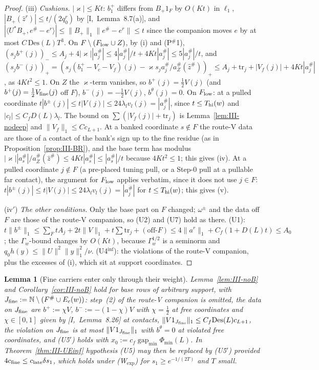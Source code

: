 \documentclass[10pt]{amsart}
\newtheorem{lemma}[theorem]{Lemma}
\theoremstyle{definition}
\theoremstyle{remark}
\newcommand{\N}{\mathbb N}
\newcommand{\gap}{\operatorname{gap}}
\newcommand{\zh}{\hat z}
\newcommand{\ip}[2]{\langle #1,#2\rangle}
\begin{document}
\begin{proof}
(iii) \emph{Cushions.}  $|\varkappa|\le Kt$: $b^+_1$ differs from $B_+1_F$ by
$O(Kt)$ in $\ell_1$, $|B_+(\zh^r)|\le t/(2q^r_0)$ by [I,~Lemma~8.7(a)], and
$|\ip{U^*B_+}{e^\#-e^r}|\le\|B_+\|_1\|e^\#-e^r\|\le t$ since the companion
moves $e$ by at most $C\,\mathrm{Des}(L)T^3$.  On $F\setminus(F_{\rm low}\cup Z)$,
by (i) and (P$^\#$1), $(s_jb^+(j))_-\le A_j+4|\varkappa||a^\#_j|\le
4|a^\#_j|/t+4Kt|a^\#_j|\le5|a^\#_j|/t$, and $(s_jb^-(j))_+=(s_j(b^+_1-V_c-V_f)(j)
-\varkappa s_ja^\#_j/a^\#_Z(\zh^\#))_+\le A_j+\mathrm{tr}_j+|V_f(j)|+4Kt|a^\#_j|$,
as $4Kt^2\le1$.  On $Z$ the $\varkappa$-term vanishes, so $b^+(j)=\frac12V(j)$
(and $b^+(j)=\frac12V_{\rm fine}(j)$ off $F$), $b^-(j)=-\frac12V(j)$, $b^\theta(j)=0$.
On $F_{\rm low}$: at a pulled coordinate
$t|b^\pm(j)|\le t|V(j)|\le24\lambda_lv_l(j)=|a^\#_j|$, since $t\le T_{\rm hi}(w)$
and $|c_l|\le C_fD(L)\lambda_l$.  The bound on $\sum(|V_f(j)|+\mathrm{tr}_j)$ is
Lemma~\ref{lem:III-nodeep} and $\|V_f\|_1\le Cc_{L+1}$.
At a banked coordinate $s\notin F$ the route-V data are those of a contact
of the bank's sign up to the fine residue (as in Proposition~\ref{prop:III-BR}),
and the base term has modulus $|\varkappa||a^\#_s|/a^\#_Z(\zh^\#)\le4Kt|a^\#_s|
\le|a^\#_s|/t$ because $4Kt^2\le1$; this gives (iv).  At a pulled coordinate
$j\notin F$ (a pre-placed tuning pull, or a Step-0 pull at a pullable far
contact), the argument for $F_{\rm low}$ applies verbatim, since it does not
use $j\in F$: $t|b^\pm(j)|\le t|V(j)|\le24\lambda_lv_l(j)=|a^\#_j|$ for
$t\le T_{\rm hi}(w)$; this gives (v).

(iv$'$) \emph{The other conditions.}  Only the base part on $F$ changed; $\omega^\pm$
and the data off $F$ are those of the route-V companion, so (U2) and (U7) hold
as there.  (U1): $t\|b^\pm\|_1\le\sum_FtA_j+2t\|V\|_1+t\sum\mathrm{tr}_j+
(\text{off-}F)\le4\|a^r\|_1+C_f(1+D(L)t)\le A_0$; the $\Gamma_w$-bound changes
by $O(Kt)$, because $\Gamma_w^{1/2}$ is a seminorm and $q_0h(y)\le\|U\|^2
\|y\|_1^2/\nu$.  (U4$^{\inf}$): the violations of the route-V companion, plus
the excesses of (i), which sit at support coordinates.
\end{proof}

\begin{lemma}[Fine carriers enter only through their weight]\label{lem:III-noBinf}
Lemma~\textup{\ref{lem:III-noB}} and Corollary~\textup{\ref{cor:III-noB}} hold for
base rows of arbitrary support, with $J_{\rm fine}:=\N\setminus(F^\#\cup
E_c(w))$: step~\textup{(2)} of the route-V companion is omitted, the data on
$J_{\rm fine}$ are $b^+:=\chi V$, $b^-:=-(1-\chi)V$ with $\chi=\frac12$ at free
coordinates and $\chi\in[0,1]$ given by [I,~Lemma~8.26] at contacts,
$\|V1_{J_{\rm fine}}\|_1\le C_f\mathrm{Des}(L)c_{L+1}$, the violation on
$J_{\rm fine}$ is at most $\|V1_{J_{\rm fine}}\|_1$ with $b^\theta=0$ at
violated free coordinates, and \textup{(U5$'$)} holds with
$x_0:=c_f\gap_{\min}\Phi_{\min}(L)$.  In Theorem~\textup{\ref{thm:III-UEinf}}
hypothesis \textup{(U5)} may then be replaced by \textup{(U5$'$)} provided
$4c_{\rm fine}\le c_{\rm late}\delta s_1$, which holds under \textup{(W$_{\exp}$)}
for $s_1\ge e^{-1/(2T)}$ and $T$ small.
\end{lemma}
\end{document}
